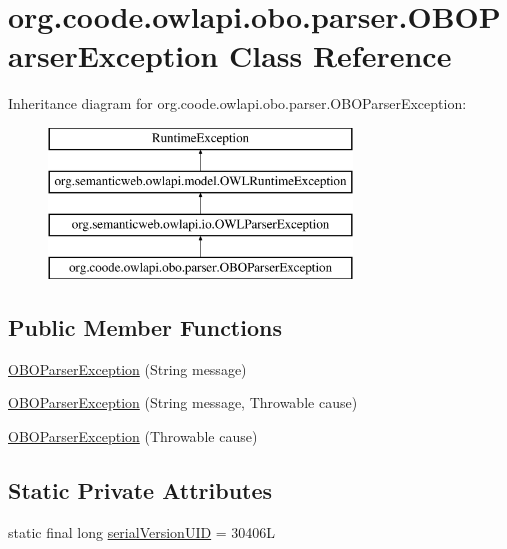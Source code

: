 \hypertarget{classorg_1_1coode_1_1owlapi_1_1obo_1_1parser_1_1_o_b_o_parser_exception}{\section{org.\-coode.\-owlapi.\-obo.\-parser.\-O\-B\-O\-Parser\-Exception Class Reference}
\label{classorg_1_1coode_1_1owlapi_1_1obo_1_1parser_1_1_o_b_o_parser_exception}
}
Inheritance diagram for org.\-coode.\-owlapi.\-obo.\-parser.\-O\-B\-O\-Parser\-Exception\-:\begin{figure}[H]
\begin{center}
\leavevmode
\includegraphics[height=4.000000cm]{classorg_1_1coode_1_1owlapi_1_1obo_1_1parser_1_1_o_b_o_parser_exception}
\end{center}
\end{figure}
\subsection*{Public Member Functions}
\begin{DoxyCompactItemize}
\item 
\hyperlink{classorg_1_1coode_1_1owlapi_1_1obo_1_1parser_1_1_o_b_o_parser_exception_a4a78334da833402d76ddeeca364c3f6d}{O\-B\-O\-Parser\-Exception} (String message)
\item 
\hyperlink{classorg_1_1coode_1_1owlapi_1_1obo_1_1parser_1_1_o_b_o_parser_exception_afa401f3a40106d2a7ebfc62c41615c83}{O\-B\-O\-Parser\-Exception} (String message, Throwable cause)
\item 
\hyperlink{classorg_1_1coode_1_1owlapi_1_1obo_1_1parser_1_1_o_b_o_parser_exception_a8fa12acb741c04449b9d52e36d07c1a1}{O\-B\-O\-Parser\-Exception} (Throwable cause)
\end{DoxyCompactItemize}
\subsection*{Static Private Attributes}
\begin{DoxyCompactItemize}
\item 
static final long \hyperlink{classorg_1_1coode_1_1owlapi_1_1obo_1_1parser_1_1_o_b_o_parser_exception_a8a638c9041da7aefb43852bc53731543}{serial\-Version\-U\-I\-D} = 30406\-L
\end{DoxyCompactItemize}


